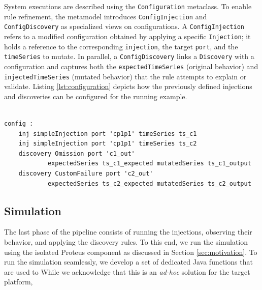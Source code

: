 System executions are described using the \texttt{Configuration} metaclass. To enable rule refinement, the metamodel  introduces \texttt{ConfigInjection} and \texttt{Config\-Discovery} as specialized views on configurations. A \texttt{ConfigInjection} refers to a modified configuration obtained by applying a specific \texttt{Injection}; it holds a reference to the corresponding \texttt{injection}, the target \texttt{port}, and the \texttt{timeSeries} to mutate. In parallel, a \texttt{ConfigDiscovery} links a \texttt{Discovery} with a configuration and captures both the \texttt{expectedTimeSeries} (original behavior) and \texttt{injectedTimeSeries} (mutated behavior) that the rule attempts to explain or validate. Listing \ref{lst:configuration} depicts how the previously defined injections and discoveries can be configured for the running example. 

\begin{lstlisting}[style=JavaStyle,caption=Configuration of injections and discoveries.,label=lst:configuration]

config :
	inj simpleInjection port 'cp1p1' timeSeries ts_c1
	inj simpleInjection port 'cp1p1' timeSeries ts_c2
	discovery Omission port 'c1_out' 
            expectedSeries ts_c1_expected mutatedSeries ts_c1_output
	discovery CustomFailure port 'c2_out' 
            expectedSeries ts_c2_expected mutatedSeries ts_c2_output
\end{lstlisting}




\subsection{Simulation} 


The last phase of the pipeline consists of running the injections, observing their behavior, and applying the discovery rules. To this end, we run the simulation using the isolated Proteus component as discussed in Section \ref{sec:motivation}. To run the simulation seamlessly, we develop a set of dedicated Java functions that are used to 
While we acknowledge that this is an \textit{ad-hoc} solution for the target platform,  




